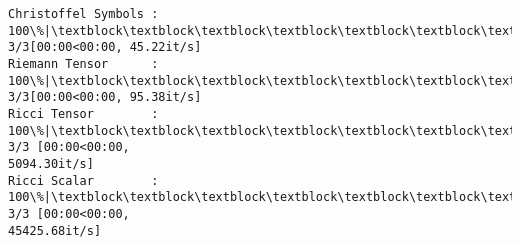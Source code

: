 \documentclass[11pt]{article}
\newcommand{\prompt}[4]{
        {\ttfamily\llap{{\color{#2}[#3]:\hspace{3pt}#4}}\vspace{-\baselineskip}}
    }
\begin{document}
    \begin{Verbatim}[commandchars=\\\{\}]
Christoffel Symbols : 100\%|\textblock\textblock\textblock\textblock\textblock\textblock\textblock\textblock\textblock\textblock\textblock\textblock\textblock\textblock\textblock\textblock\textblock\textblock\textblock\textblock\textblock\textblock\textblock\textblock\textblock\textblock\textblock\textblock\textblock\textblock\textblock\textblock\textblock\textblock\textblock| 3/3[00:00<00:00, 45.22it/s]
Riemann Tensor      : 100\%|\textblock\textblock\textblock\textblock\textblock\textblock\textblock\textblock\textblock\textblock\textblock\textblock\textblock\textblock\textblock\textblock\textblock\textblock\textblock\textblock\textblock\textblock\textblock\textblock\textblock\textblock\textblock\textblock\textblock\textblock\textblock\textblock\textblock\textblock\textblock| 3/3[00:00<00:00, 95.38it/s]
Ricci Tensor        : 100\%|\textblock\textblock\textblock\textblock\textblock\textblock\textblock\textblock\textblock\textblock\textblock\textblock\textblock\textblock\textblock\textblock\textblock\textblock\textblock\textblock\textblock\textblock\textblock\textblock\textblock\textblock\textblock\textblock\textblock\textblock\textblock\textblock\textblock| 3/3 [00:00<00:00,
5094.30it/s]
Ricci Scalar        : 100\%|\textblock\textblock\textblock\textblock\textblock\textblock\textblock\textblock\textblock\textblock\textblock\textblock\textblock\textblock\textblock\textblock\textblock\textblock\textblock\textblock\textblock\textblock\textblock\textblock\textblock\textblock\textblock\textblock\textblock\textblock\textblock\textblock| 3/3 [00:00<00:00,
45425.68it/s]
    \end{Verbatim}
 
            
\prompt{Out}{outcolor}{7}{}
    
\end{document}

